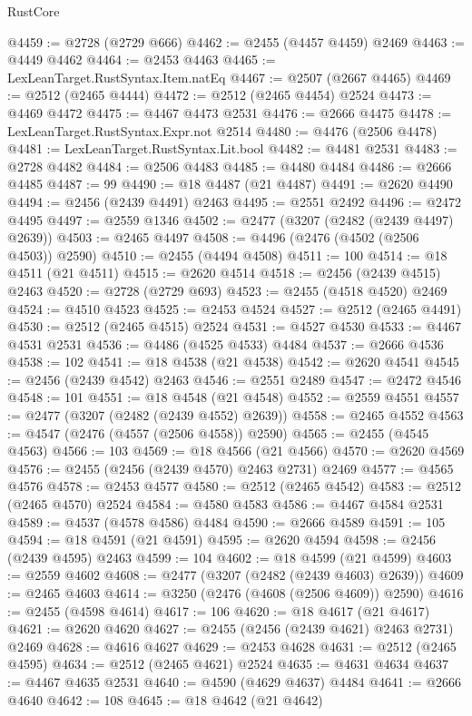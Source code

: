 \begin{lexlean}{RustCore}
\begin{coremodule}
@4459 := @2728 (@2729 @666)
@4462 := @2455 (@4457 @4459) @2469
@4463 := @4449 @4462
@4464 := @2453 @4463
@4465 := LexLeanTarget.RustSyntax.Item.natEq
@4467 := @2507 (@2667 @4465)
@4469 := @2512 (@2465 @4444)
@4472 := @2512 (@2465 @4454) @2524
@4473 := @4469 @4472
@4475 := @4467 @4473 @2531
@4476 := @2666 @4475
@4478 := LexLeanTarget.RustSyntax.Expr.not @2514
@4480 := @4476 (@2506 @4478)
@4481 := LexLeanTarget.RustSyntax.Lit.bool
@4482 := @4481 @2531
@4483 := @2728 @4482
@4484 := @2506 @4483
@4485 := @4480 @4484
@4486 := @2666 @4485
@4487 := 99
@4490 := @18 @4487 (@21 @4487)
@4491 := @2620 @4490
@4494 := @2456 (@2439 @4491) @2463
@4495 := @2551 @2492
@4496 := @2472 @4495
@4497 := @2559 @1346
@4502 := @2477 (@3207 (@2482 (@2439 @4497) @2639))
@4503 := @2465 @4497
@4508 := @4496 (@2476 (@4502 (@2506 @4503)) @2590)
@4510 := @2455 (@4494 @4508)
@4511 := 100
@4514 := @18 @4511 (@21 @4511)
@4515 := @2620 @4514
@4518 := @2456 (@2439 @4515) @2463
@4520 := @2728 (@2729 @693)
@4523 := @2455 (@4518 @4520) @2469
@4524 := @4510 @4523
@4525 := @2453 @4524
@4527 := @2512 (@2465 @4491)
@4530 := @2512 (@2465 @4515) @2524
@4531 := @4527 @4530
@4533 := @4467 @4531 @2531
@4536 := @4486 (@4525 @4533) @4484
@4537 := @2666 @4536
@4538 := 102
@4541 := @18 @4538 (@21 @4538)
@4542 := @2620 @4541
@4545 := @2456 (@2439 @4542) @2463
@4546 := @2551 @2489
@4547 := @2472 @4546
@4548 := 101
@4551 := @18 @4548 (@21 @4548)
@4552 := @2559 @4551
@4557 := @2477 (@3207 (@2482 (@2439 @4552) @2639))
@4558 := @2465 @4552
@4563 := @4547 (@2476 (@4557 (@2506 @4558)) @2590)
@4565 := @2455 (@4545 @4563)
@4566 := 103
@4569 := @18 @4566 (@21 @4566)
@4570 := @2620 @4569
@4576 := @2455 (@2456 (@2439 @4570) @2463 @2731) @2469
@4577 := @4565 @4576
@4578 := @2453 @4577
@4580 := @2512 (@2465 @4542)
@4583 := @2512 (@2465 @4570) @2524
@4584 := @4580 @4583
@4586 := @4467 @4584 @2531
@4589 := @4537 (@4578 @4586) @4484
@4590 := @2666 @4589
@4591 := 105
@4594 := @18 @4591 (@21 @4591)
@4595 := @2620 @4594
@4598 := @2456 (@2439 @4595) @2463
@4599 := 104
@4602 := @18 @4599 (@21 @4599)
@4603 := @2559 @4602
@4608 := @2477 (@3207 (@2482 (@2439 @4603) @2639))
@4609 := @2465 @4603
@4614 := @3250 (@2476 (@4608 (@2506 @4609)) @2590)
@4616 := @2455 (@4598 @4614)
@4617 := 106
@4620 := @18 @4617 (@21 @4617)
@4621 := @2620 @4620
@4627 := @2455 (@2456 (@2439 @4621) @2463 @2731) @2469
@4628 := @4616 @4627
@4629 := @2453 @4628
@4631 := @2512 (@2465 @4595)
@4634 := @2512 (@2465 @4621) @2524
@4635 := @4631 @4634
@4637 := @4467 @4635 @2531
@4640 := @4590 (@4629 @4637) @4484
@4641 := @2666 @4640
@4642 := 108
@4645 := @18 @4642 (@21 @4642)

\end{coremodule}
\end{lexlean}
